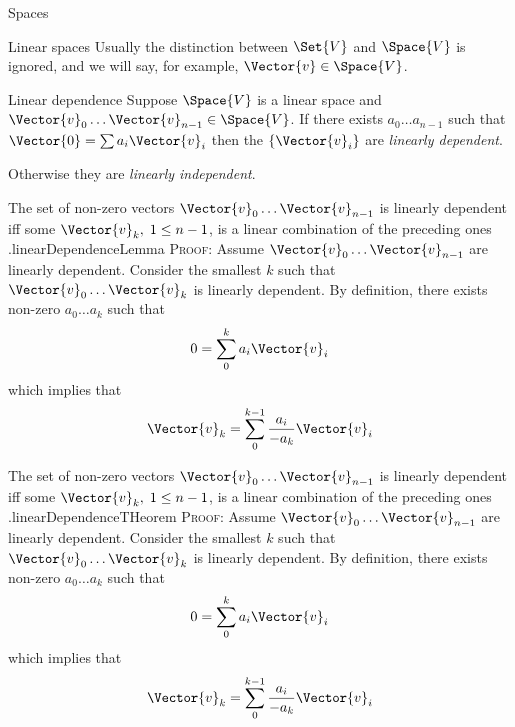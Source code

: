 \begin{plSection}{Spaces}
\begin{plSection}{Linear spaces}
Usually the distinction between $\Set{V}$ and $\Space{V}$ 
is ignored, and we will say, for example, 
$\Vector{v} \in \Space{V}$.

\begin{plDefinition}{Linear dependence}{}
Suppose $\Space{V}$ is a linear space and
$\Vector{v}_0 \ldots  \Vector{v}_{n-1} \in \Space{V}$.
If there exists $a_0 \ldots  a_{n-1}$ such that
$\Vector{0} = \sum a_i \Vector{v}_i$ then the $\left\{ \Vector{v}_i \right\}$
are \textit{linearly dependent}.

Otherwise they are \textit{linearly independent}.
\end{plDefinition}

\begin{plLemma}{The set of non-zero vectors
 $\Vector{v}_0 \ldots \Vector{v}_{n-1}$
is linearly dependent iff some $\Vector{v}_k, \; 1 \leq n-1$, 
is a linear combination of the preceding 
ones .}{linearDependenceLemma}
\textsc{Proof:}
Assume  $\Vector{v}_0 \ldots \Vector{v}_{n-1}$ are linearly dependent.
Consider the smallest $k$ such that 
$\Vector{v}_0 \ldots \Vector{v}_{k}$ is linearly dependent.
By definition,
there exists non-zero $a_0 \ldots a_{k}$ such that
\begin{equation}
0 = \sum_0^k a_i \Vector{v}_i
\end{equation}
which implies that
\begin{equation}
\Vector{v}_k = \sum_0^{k-1} \frac{a_i}{- a_k} \Vector{v}_i
\end{equation}
\end{plLemma}

\begin{plTheorem}{The set of non-zero vectors
 $\Vector{v}_0 \ldots \Vector{v}_{n-1}$
is linearly dependent iff some $\Vector{v}_k, \; 1 \leq n-1$, 
is a linear combination of the preceding 
ones .}{linearDependenceTHeorem}
\textsc{Proof:}
Assume  $\Vector{v}_0 \ldots \Vector{v}_{n-1}$ are linearly dependent.
Consider the smallest $k$ such that 
$\Vector{v}_0 \ldots \Vector{v}_{k}$ is linearly dependent.
By definition,
there exists non-zero $a_0 \ldots a_{k}$ such that
\begin{equation}
0 = \sum_0^k a_i \Vector{v}_i
\end{equation}
which implies that
\begin{equation}
\Vector{v}_k = \sum_0^{k-1} \frac{a_i}{- a_k} \Vector{v}_i
\end{equation}
\end{plTheorem}


\end{plSection}
\end{plSection}
